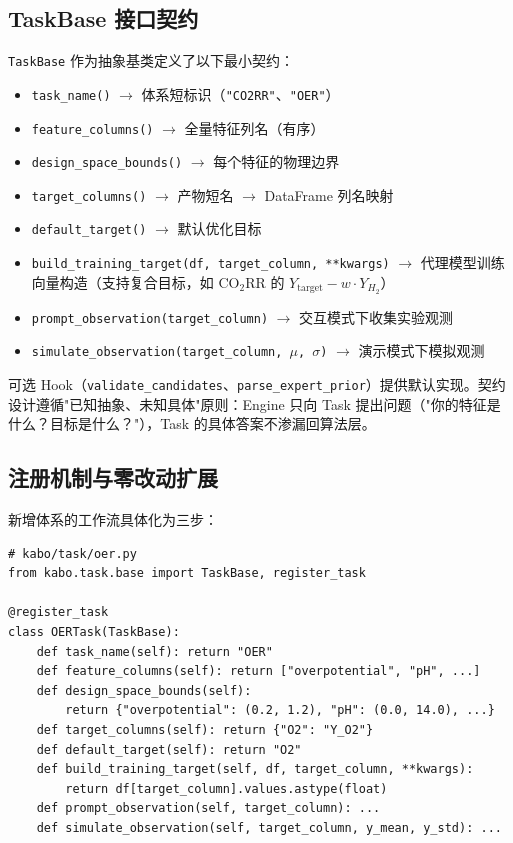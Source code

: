 \documentclass[12pt,a4paper]{article}
\begin{document}
\subsection{TaskBase 接口契约}

\texttt{TaskBase} 作为抽象基类定义了以下最小契约：

\begin{itemize}
    \item \texttt{task\_name()} $\rightarrow$ 体系短标识（\texttt{"CO2RR"}、\texttt{"OER"}）
    \item \texttt{feature\_columns()} $\rightarrow$ 全量特征列名（有序）
    \item \texttt{design\_space\_bounds()} $\rightarrow$ 每个特征的物理边界
    \item \texttt{target\_columns()} $\rightarrow$ 产物短名 $\rightarrow$ DataFrame 列名映射
    \item \texttt{default\_target()} $\rightarrow$ 默认优化目标
    \item \texttt{build\_training\_target(df, target\_column, **kwargs)} $\rightarrow$ 代理模型训练向量构造（支持复合目标，如 CO$_2$RR 的 $Y_{\text{target}} - w \cdot Y_{H_2}$）
    \item \texttt{prompt\_observation(target\_column)} $\rightarrow$ 交互模式下收集实验观测
    \item \texttt{simulate\_observation(target\_column, $\mu$, $\sigma$)} $\rightarrow$ 演示模式下模拟观测
\end{itemize}

可选 Hook（\texttt{validate\_candidates}、\texttt{parse\_expert\_prior}）提供默认实现。契约设计遵循"已知抽象、未知具体"原则：Engine 只向 Task 提出问题（"你的特征是什么？目标是什么？"），Task 的具体答案不渗漏回算法层。

\subsection{注册机制与零改动扩展}

新增体系的工作流具体化为三步：

\begin{lstlisting}[caption={新增 OERTask 的最小模板},label={lst:oer}]
# kabo/task/oer.py
from kabo.task.base import TaskBase, register_task

@register_task
class OERTask(TaskBase):
    def task_name(self): return "OER"
    def feature_columns(self): return ["overpotential", "pH", ...]
    def design_space_bounds(self):
        return {"overpotential": (0.2, 1.2), "pH": (0.0, 14.0), ...}
    def target_columns(self): return {"O2": "Y_O2"}
    def default_target(self): return "O2"
    def build_training_target(self, df, target_column, **kwargs):
        return df[target_column].values.astype(float)
    def prompt_observation(self, target_column): ...
    def simulate_observation(self, target_column, y_mean, y_std): ...
\end{lstlisting}
\end{document}
